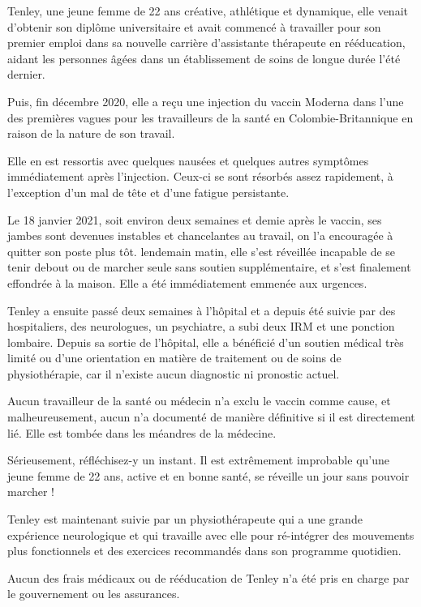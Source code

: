Tenley, une jeune femme de 22 ans créative, athlétique et dynamique, elle venait
d'obtenir son diplôme universitaire et avait commencé à travailler pour son
premier emploi dans sa nouvelle carrière d'assistante thérapeute en rééducation,
aidant les personnes âgées dans un établissement de soins de longue durée l'été
dernier.

Puis, fin décembre 2020, elle a reçu une injection du vaccin Moderna dans l'une
des premières vagues pour les travailleurs de la santé en Colombie-Britannique
en raison de la nature de son travail.

Elle en est ressortis avec quelques nausées et quelques autres symptômes
immédiatement après l'injection. Ceux-ci se sont résorbés assez rapidement, à
l'exception d'un mal de tête et d'une fatigue persistante.

Le 18 janvier 2021, soit environ deux semaines et demie après le vaccin, ses
jambes sont devenues instables et chancelantes au travail, on l'a encouragée à
quitter son poste plus tôt. lendemain matin, elle s'est réveillée incapable de
se tenir debout ou de marcher seule sans soutien supplémentaire, et s'est
finalement effondrée à la maison. Elle a été immédiatement emmenée aux urgences.

Tenley a ensuite passé deux semaines à l'hôpital et a depuis été suivie par des
hospitaliers, des neurologues, un psychiatre, a subi deux IRM et une ponction
lombaire. Depuis sa sortie de l'hôpital, elle a bénéficié d'un soutien médical
très limité ou d'une orientation en matière de traitement ou de soins de
physiothérapie, car il n'existe aucun diagnostic ni pronostic actuel.

Aucun travailleur de la santé ou médecin n'a exclu le vaccin comme cause, et
malheureusement, aucun n'a documenté de manière définitive si il est directement
lié. Elle est tombée dans les méandres de la médecine.

Sérieusement, réfléchisez-y un instant. Il est extrêmement improbable qu'une
jeune femme de 22 ans, active et en bonne santé, se réveille un jour sans
pouvoir marcher !

Tenley est maintenant suivie par un physiothérapeute qui a une grande expérience
neurologique et qui travaille avec elle pour ré-intégrer des mouvements plus
fonctionnels et des exercices recommandés dans son programme quotidien.

Aucun des frais médicaux ou de rééducation de Tenley n'a été pris en charge par
le gouvernement ou les assurances.


